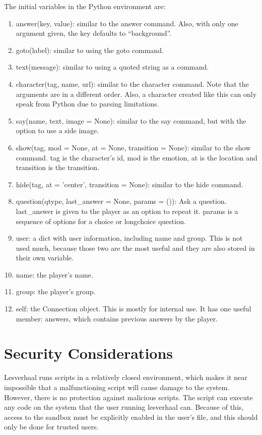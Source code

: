 \documentclass{article}
\begin{document}
The initial variables in the Python environment are:
\begin{enumerate}
	\item answer(key, value): similar to the answer command. Also, with
		only one argument given, the key defaults to ``background''.
	\item goto(label): similar to using the goto command.
	\item text(message): similar to using a quoted string as a command.
	\item character(tag, name, url): similar to the character command. Note
		that the arguments are in a different order. Also, a character
		created like this can only speak from Python due to parsing
		limitations.
	\item say(name, text, image = None): similar to the say command, but
		with the option to use a side image.
	\item show(tag, mod = None, at = None, transition = None): similar to
		the show command. tag is the character's id, mod is the
		emotion, at is the location and transition is the transition.
	\item hide(tag, at = 'center', transition = None): similar to the hide
		command.
	\item question(qtype, last\_answer = None, params = ()): Ask a
		question. last\_answer is given to the player as an option to
		repeat it. params is a sequence of options for a choice or
		longchoice question.
	\item user: a dict with user information, including name and group.
		This is not used much, because those two are the most useful
		and they are also stored in their own variable.
	\item name: the player's name.
	\item group: the player's group.
	\item self: the Connection object. This is mostly for internal use. It
		has one useful member: answers, which contains previous answers
		by the player.
\end{enumerate}

\section{Security Considerations}
Lesverhaal runs scripts in a relatively closed environment, which makes it near
impossible that a malfunctioning script will cause damage to the system.
However, there is no protection against malicious scripts. The script can
execute any code on the system that the user running lesverhaal can. Because of
this, access to the sandbox must be explicitly enabled in the user's file, and
this should only be done for trusted users.
\end{document}
